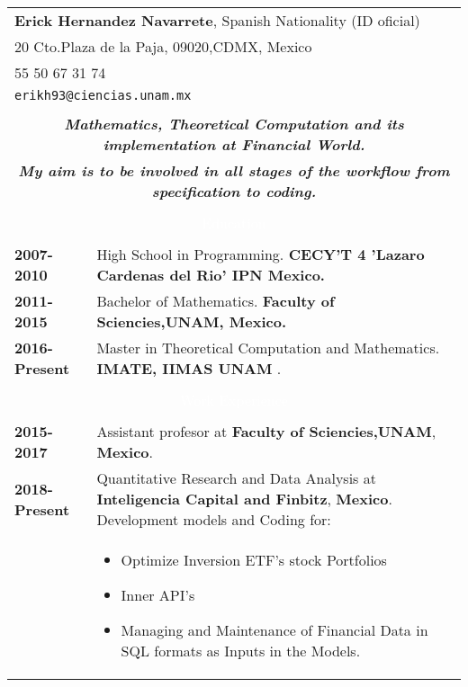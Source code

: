 \documentclass[twoside,a4paper,openright,10pt]{report}
\begin{document}
\begin{table}[ht]
\centering
\begin{tabular}{p{40mm} p{140mm}}

\multicolumn{2}{l}{\textbf{Erick Hernandez Navarrete}, Spanish Nationality (ID oficial)}\\
\multicolumn{2}{l}{20 Cto.Plaza de la Paja, 09020,CDMX, Mexico}\\
\multicolumn{2}{l}{55 50 67 31 74}\\
\multicolumn{2}{l}{\texttt{erikh93@ciencias.unam.mx}}\\ \\
\multicolumn{2}{c}{\textbf{\textit{\large Mathematics, Theoretical Computation and its implementation at Financial World.}}}\\
\multicolumn{2}{c}{\textbf{\textit{\large My aim is to be involved in all stages of the workflow from specification to coding.}}}\\ \\

\multicolumn{2}{c}{\cellcolor{black} \textcolor{white}{Education}}\\ \\

 \textbf{2007-2010} & High School in Programming. 
\textbf{CECY'T 4 'Lazaro Cardenas del Rio' IPN Mexico.}\\
 \textbf{2011-2015} & Bachelor of Mathematics. \textbf{ Faculty of Sciencies,UNAM, Mexico.}\\
 \textbf{2016-Present}& Master in Theoretical Computation and Mathematics. 
 \textbf{ IMATE, IIMAS UNAM} .\\
\\

\multicolumn{2}{c}{\cellcolor{black} \textcolor{white}{Work Experience}}\\ \\

\textbf{2015-2017} & Assistant profesor at \textbf{Faculty of Sciencies,UNAM}, \textbf{Mexico}.\\

\textbf{2018-Present} & Quantitative Research and Data Analysis at  \textbf{Inteligencia Capital and Finbitz}, \textbf{Mexico}. Development models and Coding for:\\
& \vspace{-2mm} \begin{itemize}[noitemsep,nolistsep]
\item  Optimize Inversion ETF's stock Portfolios
\item Inner API's
\item Managing and Maintenance of Financial Data in SQL formats as Inputs in the Models.
\vspace{-4mm}
\end{itemize}\\


\end{tabular}
\end{table}
\end{document}
